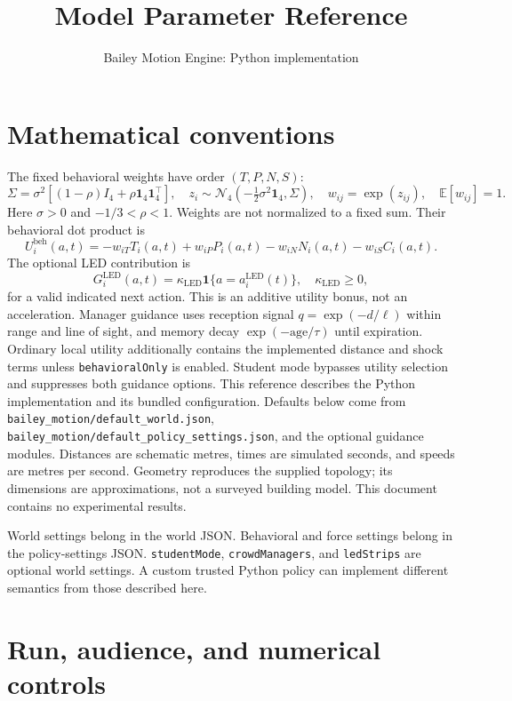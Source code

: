 \documentclass[11pt]{article}
\title{Model Parameter Reference}
\author{Bailey Motion Engine: Python implementation}
\date{}
\begin{document}
\maketitle
\tableofcontents
\section*{Mathematical conventions}
The fixed behavioral weights have order $(T,P,N,S)$:
\[
\Sigma=\sigma^2[(1-\rho)I_4+\rho\mathbf{1}_4\mathbf{1}_4^\top],\quad
z_i\sim\mathcal{N}_4(-\tfrac12\sigma^2\mathbf{1}_4,\Sigma),\quad
w_{ij}=\exp(z_{ij}),\quad \mathbb{E}[w_{ij}]=1.
\]
Here $\sigma>0$ and $-1/3<\rho<1$. Weights are not normalized to a fixed sum. Their behavioral dot product is
\[
U_i^{\mathrm{beh}}(a,t)=-w_{iT}T_i(a,t)+w_{iP}P_i(a,t)-w_{iN}N_i(a,t)-w_{iS}C_i(a,t).
\]
The optional LED contribution is
\[
G_i^{\mathrm{LED}}(a,t)=\kappa_{\mathrm{LED}}\mathbf{1}\{a=a_i^{\mathrm{LED}}(t)\},\quad \kappa_{\mathrm{LED}}\geq0,
\]
for a valid indicated next action. This is an additive utility bonus, not an acceleration. Manager guidance uses reception signal $q=\exp(-d/\ell)$ within range and line of sight, and memory decay $\exp(-\mathrm{age}/\tau)$ until expiration. Ordinary local utility additionally contains the implemented distance and shock terms unless \texttt{behavioralOnly} is enabled. Student mode bypasses utility selection and suppresses both guidance options.
This reference describes the Python implementation and its bundled configuration. Defaults below come from \texttt{bailey\_\allowbreak{}motion/\allowbreak{}default\_\allowbreak{}world.\allowbreak{}json}, \texttt{bailey\_\allowbreak{}motion/\allowbreak{}default\_\allowbreak{}policy\_\allowbreak{}settings.\allowbreak{}json}, and the optional guidance modules. Distances are schematic metres, times are simulated seconds, and speeds are metres per second. Geometry reproduces the supplied topology; its dimensions are approximations, not a surveyed building model. This document contains no experimental results.


World settings belong in the world JSON. Behavioral and force settings belong in the policy-settings JSON. \texttt{student\allowbreak{}Mode}, \texttt{crowd\allowbreak{}Managers}, and \texttt{led\allowbreak{}Strips} are optional world settings. A custom trusted Python policy can implement different semantics from those described here.


\section{Run, audience, and numerical controls}
\end{document}
